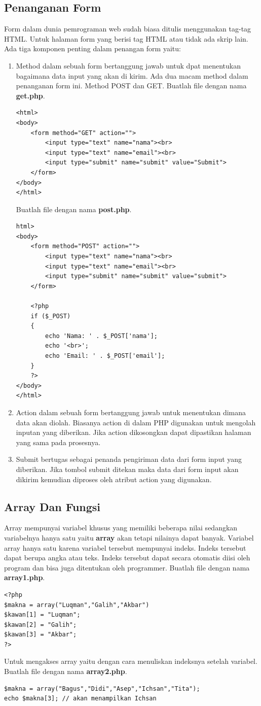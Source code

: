 \subsection{Penanganan Form}
Form dalam dunia pemrograman web sudah biasa ditulis menggunakan tag-tag HTML. Untuk halaman form yang berisi tag HTML atau tidak ada skrip lain. Ada tiga komponen penting dalam penangan form yaitu:
\begin{enumerate}
\item Method dalam sebuah form bertanggung jawab untuk dpat menentukan bagaimana data input yang akan di kirim. Ada dua macam method dalam penanganan form ini. Method POST dan GET. Buatlah file dengan nama \textbf{get.php}.
\begin{lstlisting}
<html>
<body>
	<form method="GET" action="">
		<input type="text" name="nama"><br>
		<input type="text" name="email"><br>
		<input type="submit" name="submit" value="Submit">
	</form>
</body>
</html>
\end{lstlisting}
Buatlah file dengan nama \textbf{post.php}.
\begin{lstlisting}
html>
<body>
	<form method="POST" action="">
		<input type="text" name="nama"><br>
		<input type="text" name="email"><br>
		<input type="submit" name="submit" value="submit">
	</form>

	<?php
	if ($_POST)
	{
		echo 'Nama: ' . $_POST['nama'];
		echo '<br>';
		echo 'Email: ' . $_POST['email'];
	}
	?>
</body>
</html>
\end{lstlisting}
\item Action dalam sebuah form bertanggung jawab untuk menentukan dimana data akan diolah. Biasanya action di dalam PHP digunakan untuk mengolah inputan yang diberikan. Jika action dikosongkan dapat dipastikan halaman yang sama pada prosesnya.
\item Submit bertugas sebagai penanda pengiriman data dari form input yang diberikan. Jika tombol submit ditekan maka data dari form input akan dikirim kemudian diproses oleh atribut action yang digunakan.
\end{enumerate}

\subsection{Array Dan Fungsi}
Array mempunyai variabel khusus yang memiliki beberapa nilai sedangkan variabelnya hanya satu yaitu \textbf{array} akan tetapi nilainya dapat banyak. Variabel array hanya satu karena variabel tersebut mempunyai indeks. Indeks tersebut dapat berupa angka atau teks. Indeks tersebut dapat secara otomatis diisi oleh program dan bisa juga ditentukan oleh programmer.  Buatlah file dengan nama \textbf{array1.php}.
\begin{lstlisting}
<?php
$makna = array("Luqman","Galih","Akbar")
$kawan[1] = "Luqman";
$kawan[2] = "Galih";
$kawan[3] = "Akbar";
?>
\end{lstlisting}
Untuk mengakses array yaitu dengan cara menuliskan indeksnya setelah variabel. Buatlah file dengan nama \textbf{array2.php}.
\begin{lstlisting}
$makna = array("Bagus","Didi","Asep","Ichsan","Tita");
echo $makna[3]; // akan menampilkan Ichsan
\end{lstlisting}

